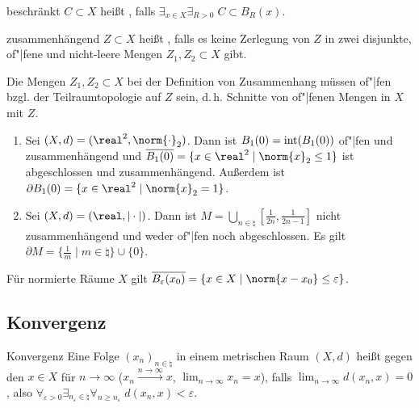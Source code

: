 \begin{Def}{beschränkt}
    $C \subset X$ heißt , falls
    $\exists_{x \in X} \exists_{R > 0}\; C \subset B_R(x)$.
\end{Def}

\begin{Def}{zusammenhängend}
    $Z \subset X$ heißt , falls
    es keine Zerlegung von $Z$ in zwei disjunkte, of"|fene und nicht-leere Mengen
    $Z_1, Z_2 \subset X$ gibt.
\end{Def}

\begin{Bem}
    Die Mengen $Z_1, Z_2 \subset X$ bei der Definition von Zusammenhang müssen of"|fen
    bzgl. der Teilraumtopologie auf $Z$ sein, d.\,h. Schnitte von of"|fenen Mengen in $X$
    mit $Z$.
\end{Bem}

\begin{Bsp}
    \begin{enumerate}[label=\emph{(\alph*)}]
        \item
        Sei $(X, d) = (\real^2, \norm{\cdot}_2)$.
        Dann ist $B_1(0) = \operatorname{int}(B_1(0))$ of"|fen und zusammenhängend und
        $\overline{B_1(0)} = \{x \in \real^2 \;|\; \norm{x}_2 \le 1\}$ ist  abgeschlossen und
        zusammenhängend.
        Außerdem ist $\partial B_1(0) = \{x \in \real^2 \;|\; \norm{x}_2 = 1\}$.

        \item
        Sei $(X, d) = (\real, |\cdot|)$.
        Dann ist $M = \bigcup_{n \in \natural} \left[\frac{1}{2n}, \frac{1}{2n-1}\right]$
        nicht zusammenhängend und weder of"|fen noch abgeschlossen.
        Es gilt $\partial M = \{\frac{1}{m} \;|\; m \in \natural\} \cup \{0\}$.
    \end{enumerate}
\end{Bsp}

\begin{Bem}
    Für normierte Räume $X$ gilt
    $\overline{B_\varepsilon(x_0)} = \{x \in X \;|\; \norm{x - x_0} \le \varepsilon\}$.
\end{Bem}

\subsection{%
    Konvergenz%
}

\begin{Def}{Konvergenz}
    Eine Folge $(x_n)_{n \in \natural}$ in einem metrischen Raum $(X, d)$
    heißt  gegen den  $x \in X$ für $n \to \infty$
    ($x_n \xrightarrow{n \to \infty} x$, $\lim_{n \to \infty} x_n = x$), falls
    $\lim_{n \to \infty} d(x_n, x) = 0$,
    also $\forall_{\varepsilon > 0} \exists_{n_\varepsilon \in \natural}
    \forall_{n \ge n_\varepsilon}\; d(x_n, x) < \varepsilon$.
\end{Def}

